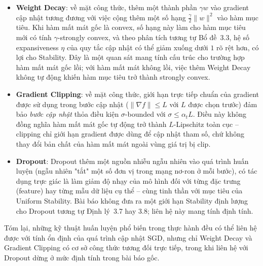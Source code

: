 \begin{itemize}
    \item \textbf{Weight Decay}: về mặt công thức, thêm một thành phần $\gamma w$ vào gradient cập nhật tương đương với việc cộng thêm một số hạng $\frac{\gamma}{2}\|w\|^2$ vào hàm mục tiêu. Khi hàm mất mát gốc là convex, số hạng này làm cho hàm mục tiêu mới có tính $\gamma$-strongly convex, và theo phân tích tương tự Bổ đề~3.3, hệ số expansiveness $\eta$ của quy tắc cập nhật có thể giảm xuống dưới $1$ rõ rệt hơn, có lợi cho Stability. Đây là một quan sát mang tính cấu trúc cho trường hợp hàm mất mát gốc lồi; với hàm mất mát không lồi, việc thêm Weight Decay không tự động khiến hàm mục tiêu trở thành strongly convex.
    \item \textbf{Gradient Clipping}: về mặt công thức, giới hạn trực tiếp chuẩn của gradient được sử dụng trong bước cập nhật ($\|\nabla f\| \le L$ với $L$ được chọn trước) đảm bảo \emph{bước cập nhật} thỏa điều kiện $\sigma$-bounded với $\sigma \le \alpha_t L$. Điều này không đồng nghĩa hàm mất mát gốc tự động trở thành $L$-Lipschitz toàn cục -- clipping chỉ giới hạn gradient được dùng để cập nhật tham số, chứ không thay đổi bản chất của hàm mất mát ngoài vùng giá trị bị clip.
    \item \textbf{Dropout}: Dropout thêm một nguồn nhiễu ngẫu nhiên vào quá trình huấn luyện (ngẫu nhiên "tắt" một số đơn vị trong mạng nơ-ron ở mỗi bước), có tác dụng trực giác là làm giảm độ nhạy của mô hình đối với từng đặc trưng (feature) hay từng mẫu dữ liệu cụ thể -- cùng tinh thần với mục tiêu của Uniform Stability. Bài báo không đưa ra một giới hạn Stability định lượng cho Dropout tương tự Định lý~3.7 hay 3.8; liên hệ này mang tính định tính.
\end{itemize}

Tóm lại, những kỹ thuật huấn luyện phổ biến trong thực hành đều có thể liên hệ được với tính ổn định của quá trình cập nhật SGD, nhưng chỉ Weight Decay và Gradient Clipping có cơ sở công thức tương đối trực tiếp, trong khi liên hệ với Dropout dừng ở mức định tính trong bài báo gốc.
